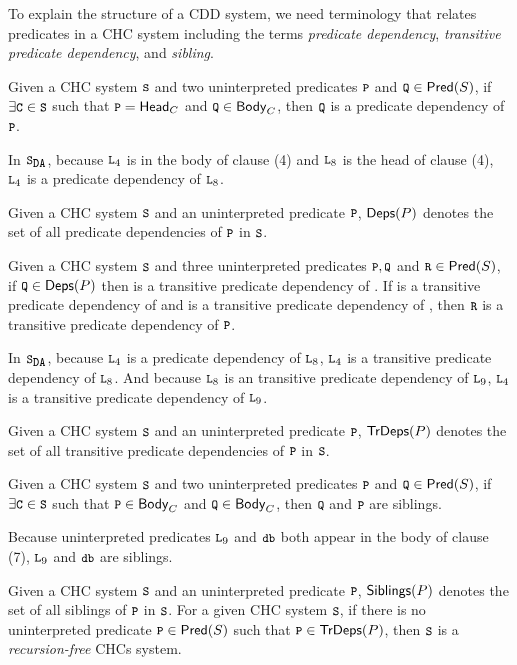 To explain the structure of a CDD system, we need terminology that relates
predicates in a CHC system including the terms \emph{predicate dependency},
\emph{transitive predicate dependency}, and \emph{sibling}.
\begin{defn}
  Given a CHC system $\cc{S}$ and two uninterpreted predicates
  $\cc{P}$ and $\cc{Q} \in \predof{S}$, if $\exists \cc{C} \in \cc{S}$
  such that $\cc{P} = \headof{C}$ and $\cc{Q} \in \bodyof{C}$, then
  $\cc{Q}$ is a predicate dependency of $\cc{P}$.
\end{defn}
%
\begin{ex}
  In $\mcchc$, because $\cc{L}_4$ is in the body of clause (4) and
  $\cc{L}_8$ is the head of clause (4), $\cc{L}_4$ is a predicate
  dependency of $\cc{L}_8$.
\end{ex}
%
Given a CHC system $\cc{S}$ and an uninterpreted predicate $\cc{P}$,
$\mathsf{Deps}(P)$ denotes the set of all predicate dependencies of $\cc{P}$
in $\cc{S}$.
%
\begin{defn}
  Given a CHC system $\cc{S}$ and three uninterpreted predicates
  $\cc{P}, \cc{Q}$ and $\cc{R} \in \predof{S}$, if $\cc{Q} \in
  \depsof{P}$ then  is a transitive predicate dependency of
  .
  If  is a transitive predicate dependency of  and 
  is a transitive predicate dependency of , then $\cc{R}$ is a
  transitive predicate dependency of $\cc{P}$.
\end{defn}
%
\begin{ex}
  In $\mcchc$, because $\cc{L}_4$ is a predicate dependency of
  $\cc{L}_8$, $\cc{L}_4$ is a transitive predicate dependency of
  $\cc{L}_8$.
  And because $\cc{L}_8$ is an transitive predicate dependency of
  $\cc{L}_9$, $\cc{L}_4$ is a transitive predicate dependency of
  $\cc{L}_9$.
\end{ex}
%
Given a CHC system $\cc{S}$ and an uninterpreted predicate $\cc{P}$,
$\mathsf{TrDeps}(P)$ denotes the set of all transitive predicate dependencies
of $\cc{P}$ in $\cc{S}$.
%
\begin{defn}
  Given a CHC system $\cc{S}$ and two uninterpreted predicates
  $\cc{P}$ and $\cc{Q} \in \predof{S}$, if $\exists \cc{C} \in \cc{S}$
  such that $\cc{P} \in \bodyof{C}$ and $\cc{Q} \in \bodyof{C}$, then
  $\cc{Q}$ and $\cc{P}$ are siblings.
\end{defn}
%
\begin{ex}
  Because uninterpreted predicates $\cc{L}_9$ and $\cc{db}$ both
  appear in the body of clause (7), $\cc{L}_9$ and $\cc{db}$ are
  siblings.
\end{ex}
%
Given a CHC system $\cc{S}$ and an uninterpreted predicate $\cc{P}$,
$\mathsf{Siblings}(P)$ denotes the set of all siblings of $\cc{P}$
in $\cc{S}$.
%
For a given CHC system $\cc{S}$, if there is no uninterpreted
predicate $\cc{P} \in \predof{S}$ such that $\cc{P} \in \tdepsof{P}$,
then $\cc{S}$ is a \emph{recursion-free} CHCs system.
%

